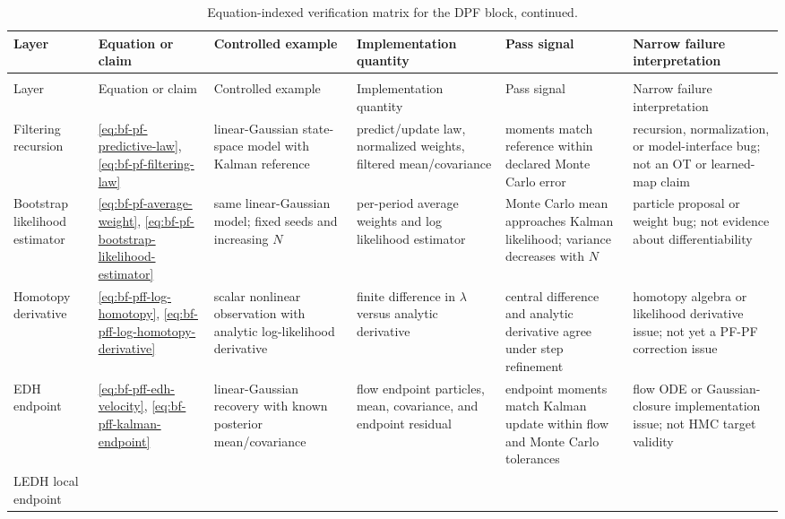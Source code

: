 \begin{center}
\scriptsize
\begin{longtable}{@{}p{} p{} p{} p{} p{} p{}@{}}
\caption{Equation-indexed verification matrix for the DPF block.}
\label{tab:bf-dpf-debug-equation-test-matrix}\\
\toprule
Layer & Equation or claim & Controlled example & Implementation quantity & Pass signal & Narrow failure interpretation \\
\midrule
\endfirsthead
\caption[]{Equation-indexed verification matrix for the DPF block, continued.}\\
\toprule
Layer & Equation or claim & Controlled example & Implementation quantity & Pass signal & Narrow failure interpretation \\
\midrule
\endhead
\bottomrule
\endlastfoot
Filtering recursion &
\eqref{eq:bf-pf-predictive-law}, \eqref{eq:bf-pf-filtering-law} &
linear-Gaussian state-space model with Kalman reference &
predict/update law, normalized weights, filtered mean/covariance &
moments match reference within declared Monte Carlo error &
recursion, normalization, or model-interface bug; not an OT or learned-map claim \\
Bootstrap likelihood estimator &
\eqref{eq:bf-pf-average-weight}, \eqref{eq:bf-pf-bootstrap-likelihood-estimator} &
same linear-Gaussian model; fixed seeds and increasing $N$ &
per-period average weights and log likelihood estimator &
Monte Carlo mean approaches Kalman likelihood; variance decreases with $N$ &
particle proposal or weight bug; not evidence about differentiability \\
Homotopy derivative &
\eqref{eq:bf-pff-log-homotopy}, \eqref{eq:bf-pff-log-homotopy-derivative} &
scalar nonlinear observation with analytic log-likelihood derivative &
finite difference in $\lambda$ versus analytic derivative &
central difference and analytic derivative agree under step refinement &
homotopy algebra or likelihood derivative issue; not yet a PF-PF correction issue \\
EDH endpoint &
\eqref{eq:bf-pff-edh-velocity}, \eqref{eq:bf-pff-kalman-endpoint} &
linear-Gaussian recovery with known posterior mean/covariance &
flow endpoint particles, mean, covariance, and endpoint residual &
endpoint moments match Kalman update within flow and Monte Carlo tolerances &
flow ODE or Gaussian-closure implementation issue; not HMC target validity \\
LEDH local endpoint &

\end{longtable}
\end{center}
